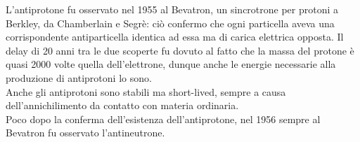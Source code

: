 L'antiprotone fu osservato nel 1955 al Bevatron, un sincrotrone per protoni a Berkley, da Chamberlain e Segrè: ciò confermo che ogni particella aveva una corrispondente antiparticella identica ad essa ma di carica elettrica opposta. Il delay di 20 anni tra le due scoperte fu dovuto al fatto che la massa del protone è quasi 2000 volte quella dell'elettrone, dunque anche le energie necessarie alla produzione di antiprotoni lo sono.\\
Anche gli antiprotoni sono stabili ma short-lived, sempre a causa dell'annichilimento da contatto con materia ordinaria.\\
Poco dopo la conferma dell'esistenza dell'antiprotone, nel 1956 sempre al Bevatron fu osservato l'antineutrone.










